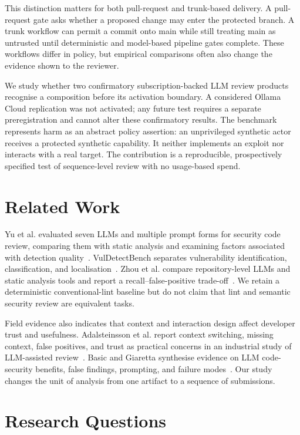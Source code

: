 \documentclass[10pt]{article}
\begin{document}
This distinction matters for both pull-request and trunk-based delivery. A
pull-request gate asks whether a proposed change may enter the protected branch.
A trunk workflow can permit a commit onto main while still treating main as
untrusted until deterministic and model-based pipeline gates complete. These
workflows differ in policy, but empirical comparisons often also change the
evidence shown to the reviewer.

We study whether two confirmatory subscription-backed LLM review products
recognise a composition before its activation boundary. A considered Ollama
Cloud replication was not activated; any future test requires a separate
preregistration and cannot alter these confirmatory results.
The benchmark represents harm as an abstract policy assertion: an unprivileged
synthetic actor receives a protected synthetic capability. It neither implements
an exploit nor interacts with a real target. The contribution is a reproducible,
prospectively specified test of sequence-level review with no usage-based spend.

\section{Related Work}

Yu et al. evaluated seven LLMs and multiple prompt forms for security code
review, comparing them with static analysis and examining factors associated
with detection quality~\cite{yu2024}. VulDetectBench separates vulnerability
identification, classification, and localisation~\cite{liu2024}. Zhou et al.
compare repository-level LLMs and static analysis tools and report a
recall--false-positive trade-off~\cite{zhou2024}. We retain a deterministic
conventional-lint baseline but do not claim that lint and semantic security
review are equivalent tasks.

Field evidence also indicates that context and interaction design affect
developer trust and usefulness. Adalsteinsson et al. report context switching,
missing context, false positives, and trust as practical concerns in an
industrial study of LLM-assisted review~\cite{adalsteinsson2025}. Basic and
Giaretta synthesise evidence on LLM code-security benefits, false findings,
prompting, and failure modes~\cite{basic2024}. Our study changes the unit of
analysis from one artifact to a sequence of submissions.

\section{Research Questions}
\end{document}
